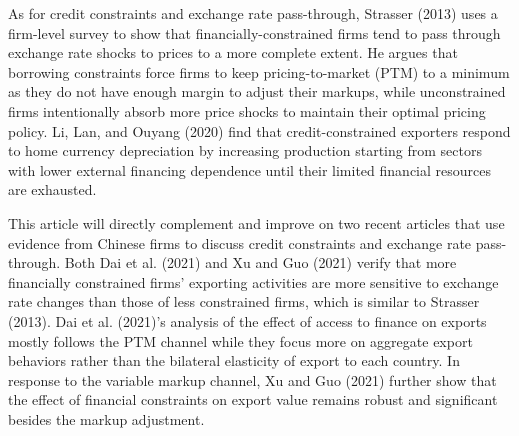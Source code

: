 As for credit constraints and exchange rate pass-through, Strasser (2013)\cite{strasser2013} uses a firm-level survey to show that financially-constrained firms tend to pass through exchange rate shocks to prices to a more complete extent. He argues that borrowing constraints force firms to keep pricing-to-market (PTM) to a minimum as they do not have enough margin to adjust their markups, while unconstrained firms intentionally absorb more price shocks to maintain their optimal pricing policy. Li, Lan, and Ouyang (2020)\cite{li-lan-ouyang2015} find that credit-constrained exporters respond to home currency depreciation by increasing production starting from sectors with lower external financing dependence until their limited financial resources are exhausted.

This article will directly complement and improve on two recent articles that use evidence from Chinese firms to discuss credit constraints and exchange rate pass-through. Both Dai et al. (2021)\cite{dai2021} and Xu and Guo (2021)\cite{xu-guo2021} verify that more financially constrained firms' exporting activities are more sensitive to exchange rate changes than those of less constrained firms, which is similar to Strasser (2013)\cite{strasser2013}. Dai et al. (2021)\cite{dai2021}'s analysis of the effect of access to finance on exports mostly follows the PTM channel while they focus more on aggregate export behaviors rather than the bilateral elasticity of export to each country. In response to the variable markup channel, Xu and Guo (2021)\cite{xu-guo2021} further show that the effect of financial constraints on export value remains robust and significant besides the markup adjustment. 

\newpage
